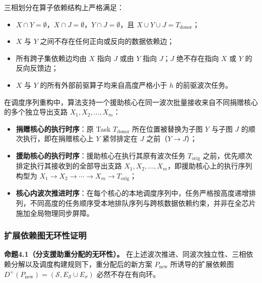 \documentclass[anonymous,notoc]{gmcm2026}
\providecommand{\tightlist}{\setlength{\itemsep}{0pt}\setlength{\parskip}{0pt}}
\begin{document}
三相划分在算子依赖结构上严格满足：

\begin{itemize}
\tightlist
\item
  \(X \cap Y = \emptyset\)，\(X \cap J = \emptyset\)，\(Y \cap J = \emptyset\)，且 \(X \cup Y \cup J = T_{\mathrm{donor}}\)；
\item
  \(X\) 与 \(Y\) 之间不存在任何正向或反向的数据依赖边；
\item
  所有跨子集依赖边均由 \(X\) 指向 \(J\) 或由 \(Y\) 指向 \(J\)；\(J\) 绝不存在指向 \(X\) 或 \(Y\) 的反向反馈边；
\item
  \(X\) 与 \(Y\) 的所有外部前驱算子均来自高度严格小于 \(h\) 的前驱波次任务。
\end{itemize}

在调度序列重构中，算法支持一个援助核心在同一波次批量接收来自不同捐赠核心的多个独立导出支路 \(X_1, X_2, \dots, X_m\)：

\begin{itemize}
\tightlist
\item
  \textbf{捐赠核心的执行时序}：原 Task \(T_{\mathrm{donor}}\) 所在位置被替换为子图 \(Y\) 与子图 \(J\) 的顺次执行，即在捐赠核心上 \(Y\) 紧邻排定在 \(J\) 之前（\(Y \to J\)）；
\item
  \textbf{援助核心的执行时序}：援助核心在执行其原有波次任务 \(T_{\mathrm{orig}}\) 之前，优先顺次排定执行其接收到的全部导出支路 \(X_1, X_2, \dots, X_m\)，即援助核心上的执行序列构型为 \(X_1 \to X_2 \to \cdots \to X_m \to T_{\mathrm{orig}}\)；
\item
  \textbf{核心内波次推进时序}：在每个核心的本地调度序列中，任务严格按高度递增排列，不同高度的任务顺序受本地排队序列与跨核数据依赖约束，并非在全芯片施加全局物理同步屏障。
\end{itemize}

\subsubsection{扩展依赖图无环性证明}

\textbf{命题4.1（分支援助重分配的无环性）。} 在上述波次推进、同波次独立性、三相依赖分解以及调度构建规则下，重分配后的新方案 \(P_{\mathrm{new}}\) 所诱导的扩展依赖图 \(D^+(P_{\mathrm{new}}) = (\mathcal{S}, E_{\mathcal{S}} \cup E_\sigma)\) 必然不存在有向环。
\end{document}

